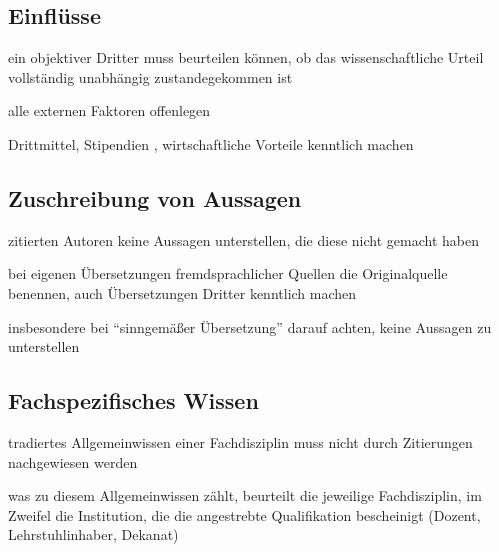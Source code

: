 \documentclass[a4paper,oneside,DIV8,10pt]{scrartcl}
\begin{document}
    \subsection{Einflüsse}
    \begin{compactitem}
        \item ein objektiver Dritter muss beurteilen können, ob das 
        wissenschaftliche Urteil vollständig unabhängig zustandegekommen ist
        \item alle externen Faktoren offenlegen
        \item Drittmittel, Stipendien , wirtschaftliche Vorteile kenntlich machen
    \end{compactitem}

    \subsection{Zuschreibung von Aussagen}
    \begin{compactitem}
        \item zitierten Autoren keine Aussagen unterstellen, die diese nicht 
        gemacht haben
        \item bei eigenen Übersetzungen fremdsprachlicher Quellen die 
        Originalquelle benennen, auch Übersetzungen Dritter kenntlich machen
        \item insbesondere bei \enquote{sinngemäßer Übersetzung} darauf achten, 
        keine Aussagen zu unterstellen
    \end{compactitem}
 
    \subsection{Fachspezifisches Wissen}
    \begin{compactitem}
        \item tradiertes Allgemeinwissen einer Fachdisziplin muss nicht
        durch Zitierungen nachgewiesen werden
        \item was zu diesem Allgemeinwissen zählt, beurteilt die jeweilige
        Fachdisziplin, im Zweifel die Institution, die die angestrebte 
        Qualifikation bescheinigt (Dozent, Lehrstuhlinhaber, Dekanat)
    \end{compactitem}
\end{document}
